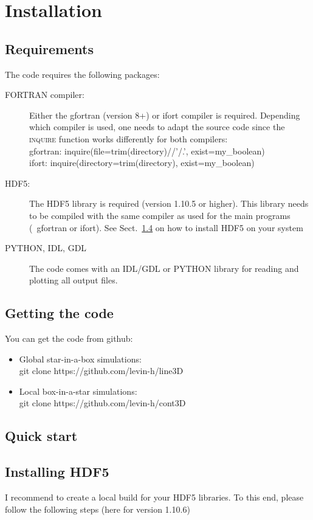 \documentclass[10pt,a4paper]{article}
\begin{document}
\section{Installation}
\subsection{Requirements}
The code requires the following packages:
\begin{description}
\item[\textsc{FORTRAN} compiler:] Either the gfortran (version  8+) or ifort compiler is required. Depending which compiler is used, one needs to adapt the source code since the \textsc{inquire} function works differently for both compilers:
  \\
  gfortran: inquire(file=trim(directory)//'/.', exist=my\_boolean)
  \\
  ifort: inquire(directory=trim(directory), exist=my\_boolean)
\item[\textsc{HDF5}:] The HDF5 library is required (version 1.10.5 or higher). This library needs to be compiled with the same compiler as used for the main programs (\ie~gfortran or ifort). See Sect.~\ref{subsec:hdf5} on how to install HDF5 on your system
  \item[\textsc{PYTHON, IDL, GDL}] The code comes with an IDL/GDL or PYTHON library for reading and plotting all output files.
\end{description}  
\subsection{Getting the code}
You can get the code from github:
\begin{itemize}
\item Global star-in-a-box simulations:\\
  git clone https://github.com/levin-h/line3D
\item Local box-in-a-star simulations:\\
  git clone https://github.com/levin-h/cont3D
\end{itemize}
%
%
%
\subsection{Quick start}


\subsection{Installing HDF5}
\label{subsec:hdf5}
I recommend to create a local build for your HDF5 libraries. To this end, please follow the following steps (here for version 1.10.6)
\end{document}
